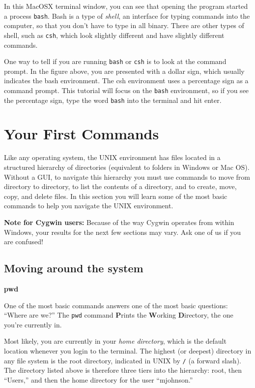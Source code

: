\documentclass[11pt, oneside]{article}   	%
\newcounter{terminal}
\newcounter{bash}
\newcommand*{\nom}[2]{{\Large\textemdash\textbf{#1}}\nomenclature{#1}{#2}}
\begin{document}
In this MacOSX terminal window, you can see that opening the program started a process \verb+bash+.
Bash is a type of \emph{shell}, an interface for typing commands into the computer, so that you don't have to type in all binary.
There are other types of shell, such as \verb+csh+, which look slightly different and have slightly different commands.

One way to tell if you are running \verb+bash+ or \verb+csh+ is to look at the command prompt. 
In the figure above, you are presented with a dollar sign, which usually indicates the bash environment. 
The csh environment uses a percentage sign as a command prompt. 
This tutorial will focus on the \verb+bash+ environment, so if you see the percentage sign, type the word \verb+bash+ into the terminal and hit enter.

\section{Your First Commands}
Like any operating system, the UNIX environment has files located in a structured hierarchy of directories (equivalent to folders in Windows or Mac OS).
Without a GUI, to navigate this hierarchy you must use commands to move from directory to directory, to list the contents of a directory, and to create, move, copy, and delete files.
In this section you will learn some of the most basic commands to help you navigate the UNIX environment.

\textbf{Note for Cygwin users:} Because of the way Cygwin operates from within Windows, your results for the next few sections may vary.
Ask one of us if you are confused!

\subsection{Moving around the system}
\nom{pwd}{Prints the current working directory}

One of the most basic commands answers one of the most basic questions: ``Where are we?'' The \verb+pwd+ command \textbf{P}rints the \textbf{W}orking \textbf{D}irectory, the one you're currently in.

Most likely, you are currently in your \emph{home directory}, which is the default location whenever you login to the terminal. 
The highest (or deepest) directory in any file system is the root directory, indicated in UNIX by \verb+/+ (a forward slash). 
The directory listed above is therefore three tiers into the hierarchy: root, then ``Users,'' and then the home directory for the user ``mjohnson.''
\end{document}
